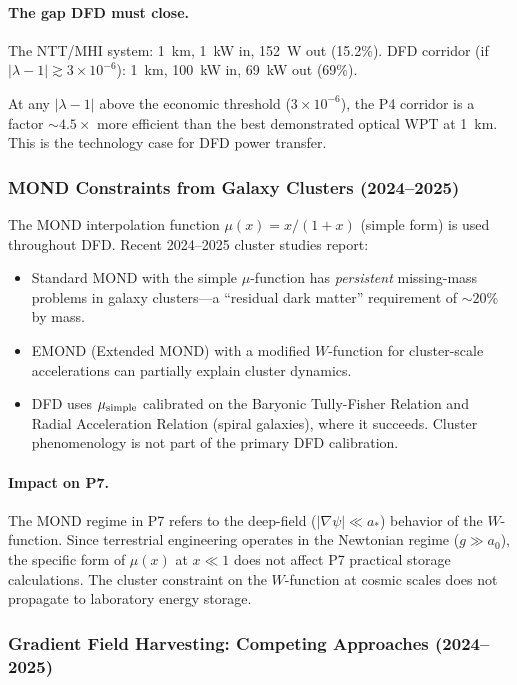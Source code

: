 \documentclass[aps,prd,twocolumn,superscriptaddress,nofootinbib]{revtex4-2}
\begin{document}
\paragraph{The gap DFD must close.}
The NTT/MHI system: 1~km, 1~kW in, 152~W out (15.2\%).
DFD corridor (if $|\lambda-1| \gtrsim 3\times10^{-6}$): 1~km, 100~kW in,
69~kW out (69\%).

At any $|\lambda-1|$ above the economic threshold ($3\times10^{-6}$), the P4
corridor is a factor $\sim 4.5\times$ more efficient than the best demonstrated
optical WPT at 1~km.  This is the technology case for DFD power transfer.

\subsubsection{MOND Constraints from Galaxy Clusters (2024--2025)}

The MOND interpolation function $\mu(x) = x/(1+x)$ (simple form) is used
throughout DFD.  Recent 2024--2025 cluster studies report:

\begin{itemize}
\item Standard MOND with the simple $\mu$-function has \emph{persistent}
missing-mass problems in galaxy clusters---a ``residual dark matter''
requirement of $\sim 20\%$ by mass.
\item EMOND (Extended MOND) with a modified $W$-function for cluster-scale
accelerations can partially explain cluster dynamics.
\item DFD uses $\mu_{\rm simple}$ calibrated on the Baryonic Tully-Fisher
Relation and Radial Acceleration Relation (spiral galaxies), where it
succeeds.  Cluster phenomenology is not part of the primary DFD calibration.
\end{itemize}

\paragraph{Impact on P7.}
The MOND regime in P7 refers to the deep-field ($|\nabla\psi| \ll a_*$)
behavior of the $W$-function.  Since terrestrial engineering operates in
the Newtonian regime ($g \gg a_0$), the specific form of $\mu(x)$ at
$x \ll 1$ does not affect P7 practical storage calculations.  The cluster
constraint on the $W$-function at cosmic scales does not propagate to
laboratory energy storage.

\subsubsection{Gradient Field Harvesting: Competing Approaches (2024--2025)}
\end{document}

